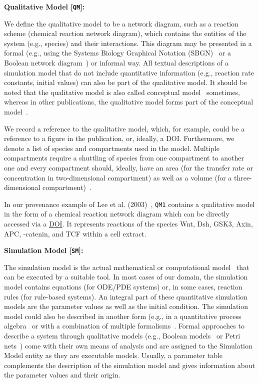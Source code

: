 \documentclass[10pt,letterpaper]{article}
\newcommand{\bcat}{\textbeta-catenin}
\newcommand{\wnt}{Wnt}
\newcommand{\lee}{Lee et al. (2003)}
\newcommand{\QM}{Qualitative Model}
\newcommand{\SM}{Simulation Model}
\begin{document}
\textbf{\QM{} [\texttt{QM}]:}

\noindent We define the qualitative model to be a network diagram, such as a reaction scheme (chemical reaction network diagram), which contains the entities of the system (e.g., species) and their interactions.
This diagram may be presented in a formal (e.g., using the Systems Biology Graphical Notation (SBGN)~\cite{LeNovere2009} or a Boolean network diagram~\cite{Glass1973}) or informal way.
All textual descriptions of a simulation model that do not include quantitative information (e.g., reaction rate constants, initial values) can also be part of the qualitative model.
It should be noted that the qualitative model is also called conceptual model~\cite{Torres2015} sometimes, whereas 
in other publications, the qualitative model forms part of the conceptual model~\cite{Wilsdorf2020b}.

We record a reference to the qualitative model, which, for example, could be a reference to a figure in the publication, or, ideally, a DOI.
Furthermore, we denote a list of species and compartments used in the model.
Multiple compartments require a shuttling of species from one compartment to another one and every compartment should, ideally, have an area (for the transfer rate or concentration in two-dimensional compartment) as well as a volume (for a three-dimensional compartment)~\cite{Hofmeyr2020}.

In our provenance example of \lee{}~\cite{Lee2003}, \texttt{QM1} contains a qualitative model in the form of a chemical reaction network diagram which can be directly accessed via a \href{https://doi.org/10.1371/journal.pbio.0000010.g001}{DOI}.
It represents reactions of the species \wnt, Dsh, GSK3, Axin, APC, \bcat{}, and TCF within a cell extract.


\textbf{\SM{} [\texttt{SM}]:}

\noindent The simulation model is the actual mathematical or computational model~\cite{Fisher2007} that can be executed by a suitable tool.
In most cases of our domain, the simulation model contains equations (for ODE/PDE systems) or, in some cases, reaction rules (for rule-based systems).
An integral part of these quantitative simulation models are the parameter values as well as the initial condition.
The simulation model could also be described in another form (e.g., in a quantitative process algebra~\cite{Ciocchetta2009, Boemo2020} or with a combination of multiple formalisms~\cite{Karr2015}.
Formal approaches to describe a system through qualitative models (e.g., Boolean models~\cite{Wang2012} or Petri nets~\cite{Chaouiya2007}) come with their own means of analysis and are assigned to the \SM{} entity as they are executable models.
Usually, a parameter table complements the description of the simulation model and gives information about the parameter values and their origin.
\end{document}
